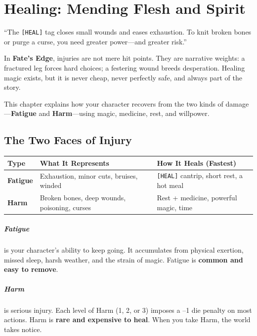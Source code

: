 \chapter{Healing: Mending Flesh and Spirit}
\label{ch:healing}

\begin{tcolorbox}[colback=black!3!white,colframe=black!60!white,title=The Gray Wanderer's Wisdom,breakable]
``The \texttt{[HEAL]} tag closes small wounds and eases exhaustion. To knit broken bones or purge a curse, you need greater power---and greater risk.''
\end{tcolorbox}

In \textbf{Fate's Edge}, injuries are not mere hit points. They are narrative weights: a fractured leg forces hard choices; a festering wound breeds desperation. Healing magic exists, but it is never cheap, never perfectly safe, and always part of the story.

This chapter explains how your character recovers from the two kinds of damage---\textbf{Fatigue} and \textbf{Harm}---using magic, medicine, rest, and willpower.

\section{The Two Faces of Injury}
\label{sec:two-faces-injury}

\begin{table}[h]
\centering
\begin{tabular}{lll}
\toprule
\textbf{Type} & \textbf{What It Represents} & \textbf{How It Heals (Fastest)} \\
\midrule
\textbf{Fatigue} & Exhaustion, minor cuts, bruises, winded & \texttt{[HEAL]} cantrip, short rest, a hot meal \\
\textbf{Harm} & Broken bones, deep wounds, poisoning, curses & Rest + medicine, powerful magic, time \\
\bottomrule
\end{tabular}
\end{table}

\paragraph{Fatigue} is your character's ability to keep going. It accumulates from physical exertion, missed sleep, harsh weather, and the strain of magic. Fatigue is \textbf{common and easy to remove}.

\paragraph{Harm} is serious injury. Each level of Harm (1, 2, or 3) imposes a --1 die penalty on most actions. Harm is \textbf{rare and expensive to heal}. When you take Harm, the world takes notice.

